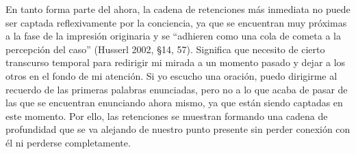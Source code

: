 En tanto forma parte del ahora, la cadena de retenciones más inmediata
no puede ser captada reflexivamente por la conciencia, ya que se
encuentran muy próximas a la fase de la impresión originaria y se
``adhieren como una cola de cometa a la percepción del caso'' (Husserl
2002, §14, 57). Significa que necesito de cierto transcurso temporal
para redirigir mi mirada a un momento pasado y dejar a los otros en el
fondo de mi atención. Si yo escucho una oración, puedo dirigirme al
recuerdo de las primeras palabras enunciadas, pero no a lo que acaba de
pasar de las que se encuentran enunciando ahora mismo, ya que están
siendo captadas en este momento. Por ello, las retenciones se muestran
formando una cadena de profundidad que se va alejando de nuestro punto
presente sin perder conexión con él ni perderse completamente.

